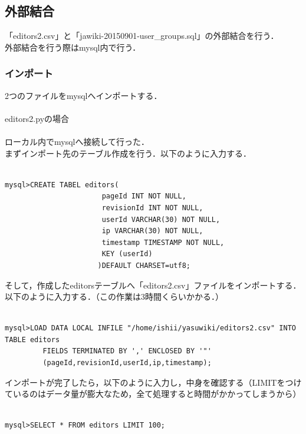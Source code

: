 \subsection{外部結合}

「editors2.csv」と「jawiki-20150901-user\_groups.sql」の外部結合を行う．　\\
外部結合を行う際はmysql内で行う． \\


\subsubsection{インポート}

2つのファイルをmysqlへインポートする．\\
\\
editors2.pyの場合 \\
\\
ローカル内でmysqlへ接続して行った．\\
まずインポート先のテーブル作成を行う．以下のように入力する．


{\small
\begin{verbatim}

mysql>CREATE TABEL editors(
                       pageId INT NOT NULL,
                       revisionId INT NOT NULL,
                       userId VARCHAR(30) NOT NULL,
                       ip VARCHAR(30) NOT NULL,
                       timestamp TIMESTAMP NOT NULL,
                       KEY (userId)
                      )DEFAULT CHARSET=utf8;

\end{verbatim}}

そして，作成したeditorsテーブルへ「editors2.csv」ファイルをインポートする．以下のように入力する．（この作業は3時間くらいかかる．）

{\small
\begin{verbatim}

mysql>LOAD DATA LOCAL INFILE "/home/ishii/yasuwiki/editors2.csv" INTO TABLE editors
         FIELDS TERMINATED BY ',' ENCLOSED BY '"'
         (pageId,revisionId,userId,ip,timestamp);

\end{verbatim}}

インポートが完了したら，以下のように入力し，中身を確認する（LIMITをつけているのはデータ量が膨大なため，全て処理すると時間がかかってしまうから）

{\small
\begin{verbatim}

mysql>SELECT * FROM editors LIMIT 100;

\end{verbatim}}

